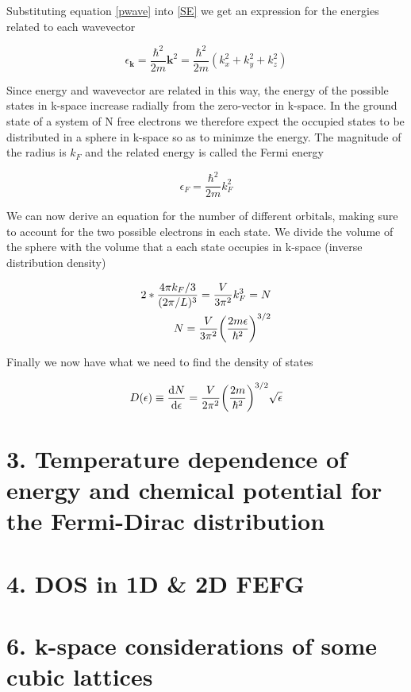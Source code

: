 \documentclass{article}
\begin{document}
Substituting equation \eqref{pwave} into \eqref{SE} we get an expression for the energies related to each wavevector

\begin{equation}
	\epsilon_{\bm{k}} = \frac{\hbar^2}{2m}\bm{k}^2 = \frac{\hbar^2}{2m}(k_x^2+k_y^2+k_z^2)
\end{equation}

Since energy and wavevector are related in this way, the energy of the possible states in k-space increase radially from the zero-vector in k-space. In the ground state of a system of N free electrons we therefore expect the occupied states to be distributed in a sphere in k-space so as to minimze the energy. The magnitude of the radius is $k_F$ and the related energy is called the Fermi energy

\begin{equation}
	\epsilon_F = \frac{\hbar^2}{2m}k_F^2
\end{equation}

We can now derive an equation for the number of different orbitals, making sure to account for the two possible electrons in each state. We divide the volume of the sphere with the volume that a each state occupies in k-space (inverse distribution density)

\begin{align}
	2*\frac{ 4\pi k_F/3 }{(2\pi/L)^3} = \frac{V}{3\pi^2}k_F^3 = N\\
	N = \frac{V}{3\pi^2}\qty(\frac{2m\epsilon}{\hbar^2})^{3/2}
\end{align}

Finally we now have what we need to find the density of states

\begin{equation}
	D(\epsilon) \equiv \dv{N}{\epsilon} = \frac{V}{2\pi^2}\qty(\frac{2m}{\hbar^2})^{3/2}\sqrt{\epsilon}
\end{equation}


\section*{3. Temperature dependence of energy and chemical potential for the Fermi-Dirac distribution}

\section*{4. DOS in 1D \& 2D FEFG}

\section*{ 6. k-space considerations of some cubic lattices }
\end{document}
